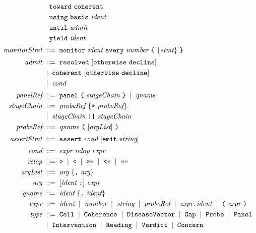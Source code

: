 \begin{definition}
\begin{align*}
  &\quad \cfckw{toward}\ \cfckw{coherent}\\
  &\quad \cfckw{using}\ \cfckw{basis}\ \textit{ident}\\
  &\quad \cfckw{until}\ \textit{admit}\\
  &\quad \cfckw{yield}\ \textit{ident}\\[2pt]
\textit{monitorStmt} &\bnf \cfckw{monitor}\ \textit{ident}\ \cfckw{every}\ \textit{number}\ \cfckw{\{}\ \{\textit{stmt}\}\ \cfckw{\}}\\[2pt]
\textit{admit} &\bnf \cfckw{resolved}\ [\cfckw{otherwise}\ \cfckw{decline}]\\
  &\alt\cfckw{coherent}\ [\cfckw{otherwise}\ \cfckw{decline}]\\
  &\alt\textit{cond}\\[2pt]
\textit{panelRef} &\bnf \cfckw{panel}\ \cfckw{\{}\ \textit{stageChain}\ \cfckw{\}}\alt\textit{qname}\\
\textit{stageChain} &\bnf \textit{probeRef}\ \{\cfckw{>>}\ \textit{probeRef}\}\\
  &\alt\textit{stageChain}\ \cfckw{||}\ \textit{stageChain}\\
\textit{probeRef} &\bnf \textit{qname}\ \cfckw{(}\ [\textit{argList}]\ \cfckw{)}\\[2pt]
\textit{assertStmt} &\bnf \cfckw{assert}\ \textit{cond}\ [\cfckw{emit}\ \textit{string}]\\[2pt]
\textit{cond} &\bnf \textit{expr}\ \textit{relop}\ \textit{expr}\\
\textit{relop} &\bnf \cfckw{>}\alt\cfckw{<}\alt\cfckw{>=}\alt\cfckw{<=}\alt\cfckw{==}\\
\textit{argList} &\bnf \textit{arg}\ \{\cfckw{,}\ \textit{arg}\}\\
\textit{arg} &\bnf [\textit{ident}\ \cfckw{:}]\ \textit{expr}\\
\textit{qname} &\bnf \textit{ident}\ \{\cfckw{.}\ \textit{ident}\}\\
\textit{expr} &\bnf \textit{ident}\alt\textit{number}\alt\textit{string}
   \alt\textit{probeRef}\alt\textit{expr}\cfckw{.}\textit{ident}\alt\cfckw{(}\ \textit{expr}\ \cfckw{)}\\
\textit{type} &\bnf \cfckw{Cell}\alt\cfckw{Coherence}\alt\cfckw{DiseaseVector}\alt\cfckw{Gap}
   \alt\cfckw{Probe}\alt\cfckw{Panel}\\
  &\alt\cfckw{Intervention}\alt\cfckw{Reading}\alt\cfckw{Verdict}\alt\cfckw{Concern}
\end{align*}
\end{definition}

